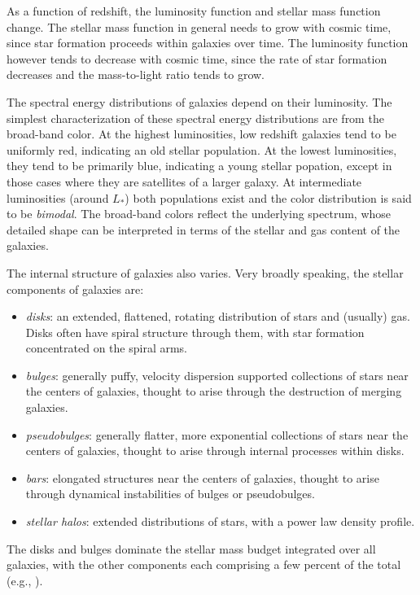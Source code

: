 As a function of redshift, the luminosity function and stellar mass
function change. The stellar mass function in general needs to grow
with cosmic time, since star formation proceeds within galaxies over
time. The luminosity function however tends to decrease with cosmic
time, since the rate of star formation decreases and the mass-to-light
ratio tends to grow.

The spectral energy distributions of galaxies depend on their
luminosity. The simplest characterization of these spectral energy
distributions are from the broad-band color. At the highest
luminosities, low redshift galaxies tend to be uniformly red,
indicating an old stellar population. At the lowest luminosities, they
tend to be primarily blue, indicating a young stellar popation, except
in those cases where they are satellites of a larger galaxy. At
intermediate luminosities (around $L_\ast$) both populations exist and
the color distribution is said to be {\it bimodal}. The broad-band
colors reflect the underlying spectrum, whose detailed shape can be
interpreted in terms of the stellar and gas content of the galaxies.

The internal structure of galaxies also varies. Very broadly speaking,
the stellar components of galaxies are:
\begin{itemize}
 \item {\it disks}: an extended, flattened, rotating distribution of
 stars and (usually) gas. Disks often have spiral structure through
 them, with star formation concentrated on the spiral arms.
 \item {\it bulges}: generally puffy, velocity dispersion supported
  collections of stars near the centers of galaxies, thought to arise
  through the destruction of merging galaxies. 
 \item {\it pseudobulges}: generally flatter, more exponential
   collections of stars near the centers of galaxies, thought to arise
   through internal processes within disks. 
 \item {\it bars}: elongated structures near the centers of galaxies,
   thought to arise through dynamical instabilities of bulges or
   pseudobulges. 
 \item {\it stellar halos}: extended distributions of stars, with a
 power law density profile.
\end{itemize}
The disks and bulges dominate the stellar mass budget integrated over
all galaxies, with the other components each comprising a few percent
of the total (e.g., \citealt{gadotti09a}).

